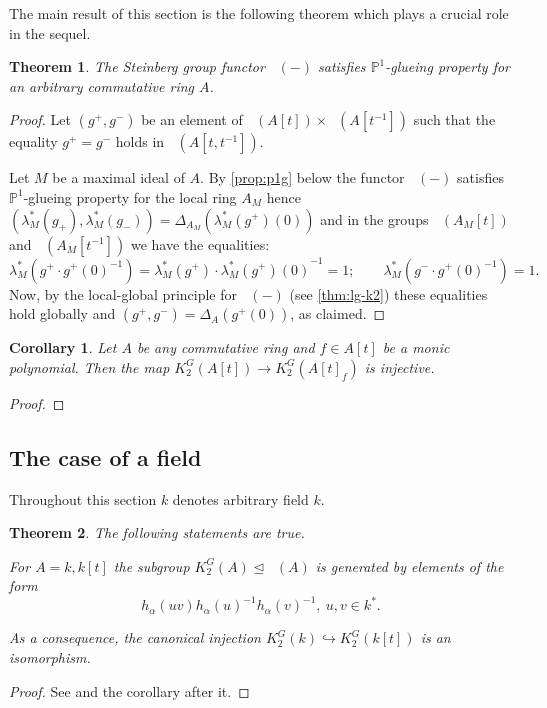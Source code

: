 \documentclass[oneside,12pt]{amsart}
\newtheorem{thm}{Theorem}
\numberwithin{equation}{section}
\numberwithin{lem}{section}
\newtheorem{cor}[lem]{Corollary}
\theoremstyle{definition}
\theoremstyle{remark}
\DeclareMathOperator{\St}{St^G}
\newcommand{\Pro}{\mathbb{P}}
\begin{document}
The main result of this section is the following theorem which plays a crucial role in the sequel.
\begin{thm} \label{thm:p1} The Steinberg group functor $\St(-)$ satisfies $\Pro^1$-glueing property for an arbitrary commutative ring $A$. \end{thm}
\begin{proof}
 Let $(g^+, g^-)$ be an element of $\St(A[t]) \times \St(A[t^{-1}])$ such that the equality $g^+ = g^-$ holds in $\St(A[t, t^{-1}])$.
 
 Let $M$ be a maximal ideal of $A$.
 By \cref{prop:p1g} below the functor $\St(-)$ satisfies $\Pro^1$-glueing property for the local ring $A_M$ hence 
 $(\lambda_M^*(g_+), \lambda_M^*(g_-)) = \Delta_{A_M}(\lambda_M^*(g^+)(0))$ and in the groups $\St(A_M[t])$ and $\St(A_M[t^{-1}])$ we have the equalities:
 $$\lambda_M^*(g^+ \cdot g^+(0)^{-1}) = \lambda_M^*(g^+) \cdot {\lambda_M^*(g^+)(0)}^{-1} = 1; \qquad \lambda_M^*(g^-\cdot g^+(0)^{-1}) =1. $$
 Now, by the local-global principle for $\St(-)$ (see \cref{thm:lg-k2}) these equalities hold globally and $(g^+, g^-) = \Delta_A(g^+(0))$, as claimed.
\end{proof}

\begin{cor} Let $A$ be any commutative ring and $f\in A[t]$ be a monic polynomial.
Then the map $K_2^G(A[t])\to K_2^G(A[t]_f)$ is injective. \end{cor}
\begin{proof}
\end{proof}

\subsection{The case of a field}
Throughout this section $k$ denotes arbitrary field $k$.
\begin{thm} \label{thm:k[t]}
The following statements are true.
\begin{thmlist}
 \item \label{satz1} For $A=k, k[t]$ the subgroup $K_2^G(A) \trianglelefteq \St(A)$ is generated by elements of the form 
  $$h_\alpha(uv) h_\alpha(u)^{-1} h_\alpha(v)^{-1},\ u,v\in k^*.$$
 \item As a consequence, the canonical injection $K_2^G(k) \hookrightarrow K_2^G(k[t])$ is an isomorphism.
\end{thmlist}
\end{thm}
\begin{proof}
 See \cite[Satz~1]{Re75} and the corollary after it.
\end{proof}
\end{document}
